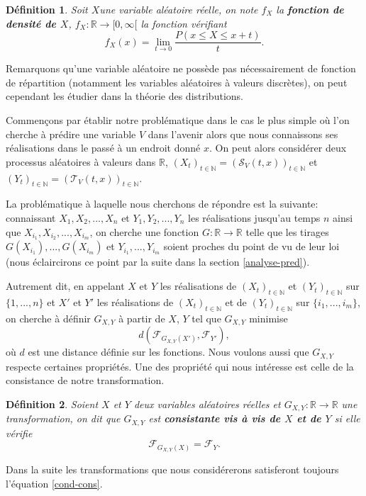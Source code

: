 \documentclass[a4paper,11pt]{article}
\newtheorem{definition}{Définition}
\begin{document}
\begin{definition}
	Soit $X$une variable aléatoire réelle, on note $f_{X}$ la \textbf{fonction de densité de $X$}, $f_{X}: \mathbb{R}\to [0,\infty[$ la fonction vérifiant
	\begin{equation}
		f_{X}(x)=\lim_{t\to 0} \frac{P(x\leq X \leq x+t)}{t}.
	\end{equation}
\end{definition}
Remarquons qu'une variable aléatoire ne possède pas nécessairement de fonction de répartition (notamment les variables aléatoires à valeurs discrètes), on peut cependant les étudier dans la théorie des distributions.


Commençons par établir notre problématique dans le cas le plus simple où l'on cherche à prédire une variable $V$ dans l'avenir alors que nous connaissons ses réalisations dans le passé à un endroit donné $x$.
On peut alors considérer deux processus aléatoires à valeurs dans $\mathbb{R}$, $(X_t)_{t \in \mathbb{N}}=(\mathcal{S}_{V}(t, x))_{t \in \mathbb{N}}$ et $(Y_t)_{t \in \mathbb{N}}=(\mathcal{T}_{V}(t, x))_{t \in \mathbb{N}}$.

La problématique à laquelle nous cherchons de répondre est la suivante: connaissant $X_1,X_2,...,X_n$ et $Y_1,Y_2,...,Y_n$ les réalisations jusqu'au temps $n$ ainsi que $X_{i_1},X_{i_2},...,X_{i_m}$, on cherche une fonction $G: \mathbb{R} \to \mathbb{R}$ telle que les tirages $G(X_{i_1}),..., G(X_{i_m})$ et $Y_{i_1},...,Y_{i_m}$ soient proches du point de vu de leur loi (nous éclaircirons ce point par la suite dans la section \ref{analyse-pred}). 

Autrement dit, en appelant $X$ et $Y$ les réalisations de $(X_t)_{t \in \mathbb{N}}$ et $(Y_t)_{t \in \mathbb{N}}$ sur $\{1,...,n\}$ et $X'$ et $Y'$ les réalisations de $(X_t)_{t \in \mathbb{N}}$ et de $(Y_t)_{t \in \mathbb{N}}$ sur $\{i_1,...,i_m\}$, on cherche à définir $G_{X,Y}$ à partir de $X$, $Y$ tel que $G_{X,Y}$ minimise 
\[d(\mathcal{F}_{G_{X,Y}(X')}, \mathcal{F}_{Y'}),\]
où $d$ est une distance définie sur les fonctions.
Nous voulons aussi que $G_{X,Y}$ respecte certaines propriétés. Une des propriété qui nous intéresse est celle de la consistance de notre transformation.

\begin{definition}
	Soient $X$ et $Y$ deux variables aléatoires réelles et $G_{X,Y}: \mathbb{R}\to \mathbb{R}$ une transformation, on dit que $G_{X,Y}$ est \textbf{consistante vis à vis de $X$ et de $Y$} si elle vérifie 
\begin{equation}
	\label{cond-cons}
	{\mathcal{F}_{G_{X,Y}(X)}}= \mathcal{F}_{Y}.
\end{equation}
\end{definition}
Dans la suite les transformations que nous considérerons satisferont toujours l'équation \eqref{cond-cons}.
\end{document}
